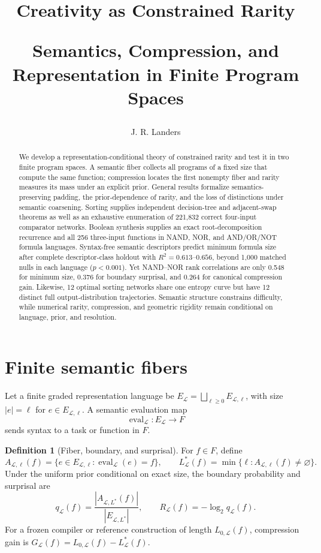 \documentclass[10pt]{article}
\title{\vspace{-1.7em}\textbf{Creativity as Constrained Rarity}\par
\vspace{-2pt}\large Semantics, Compression, and Representation in Finite Program Spaces\vspace{-0.5em}}
\author{J. R. Landers}
\date{\vspace{-1.4em}}
\theoremstyle{definition}
\newtheorem{definition}[theorem]{Definition}
\begin{document}
\maketitle
\vspace{-1.5em}

\begin{abstract}
We develop a representation-conditional theory of constrained rarity and test
it in two finite program spaces.  A semantic fiber collects all programs of a
fixed size that compute the same function; compression locates the first
nonempty fiber and rarity measures its mass under an explicit prior.  General
results formalize semantics-preserving padding, the prior-dependence of rarity,
and the loss of distinctions under semantic coarsening.  Sorting supplies
independent decision-tree and adjacent-swap theorems as well as an exhaustive
enumeration of 221,832 correct four-input comparator networks.  Boolean
synthesis supplies an exact root-decomposition recurrence and all 256
three-input functions in NAND, NOR, and AND/OR/NOT formula languages.
Syntax-free semantic descriptors predict minimum formula size after complete
descriptor-class holdout with $R^2=0.613$--$0.656$, beyond 1,000 matched nulls
in each language ($p<0.001$).  Yet NAND--NOR rank correlations are only 0.548
for minimum size, 0.376 for boundary surprisal, and 0.264 for canonical
compression gain.  Likewise, 12 optimal sorting networks share one entropy
curve but have 12 distinct full output-distribution trajectories.  Semantic
structure constrains difficulty, while numerical rarity, compression, and
geometric rigidity remain conditional on language, prior, and resolution.
\end{abstract}

\section{Finite semantic fibers}

Let a finite graded representation language be
$E_{\mathcal L}=\bigsqcup_{\ell\ge0}E_{\mathcal L,\ell}$, with size
$|e|=\ell$ for $e\in E_{\mathcal L,\ell}$.  A semantic evaluation map
\[
 \operatorname{eval}_{\mathcal L}:E_{\mathcal L}\longrightarrow F
 \tag{1}
\]
sends syntax to a task or function in $F$.

\begin{definition}[Fiber, boundary, and surprisal]
For $f\in F$, define
\[
 A_{\mathcal L,\ell}(f)
 =\{e\in E_{\mathcal L,\ell}:\operatorname{eval}_{\mathcal L}(e)=f\},
 \qquad
 L_{\mathcal L}^*(f)=\min\{\ell:A_{\mathcal L,\ell}(f)\ne\varnothing\}.
 \tag{2}
\]
Under the uniform prior conditional on exact size, the boundary probability
and surprisal are
\[
 q_{\mathcal L}(f)
 =\frac{|A_{\mathcal L,L^*}(f)|}{|E_{\mathcal L,L^*}|},
 \qquad
 R_{\mathcal L}(f)=-\log_2q_{\mathcal L}(f).
 \tag{3}
\]
For a frozen compiler or reference construction of length
$L_{0,\mathcal L}(f)$, compression gain is
$G_{\mathcal L}(f)=L_{0,\mathcal L}(f)-L_{\mathcal L}^*(f)$.
\end{definition}
\end{document}
